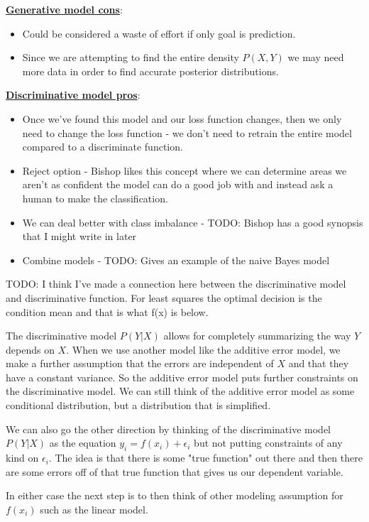 \noindent \underline{\textbf{Generative model cons}}:
\begin{itemize}
\item Could be considered a waste of effort if only goal is prediction. 
\item Since we are attempting to find the entire density $P(X,Y)$ we may need more data in order to find accurate posterior distributions.
\end{itemize}

\noindent \underline{\textbf{Discriminative model pros}}:
\begin{itemize}
\item Once we've found this model and our loss function changes, then we only need to change the loss function - we don't need to retrain the entire model compared to a discriminate function.
\item Reject option - Bishop likes this concept where we can determine areas we aren't as confident the model can do a good job with and instead ask a human to make the classification.
\item We can deal better with class imbalance - TODO: Bishop has a good synopsis that I might write in later
\item Combine models - TODO: Gives an example of the naive Bayes model
\end{itemize}

TODO: I think I've made a connection here between the discriminative model and discriminative function. For least squares the optimal decision is the condition mean and that is what f(x) is below.

The discriminative model $P(Y|X)$ allows for completely summarizing the way $Y$ depends on $X$. When we use another model like the additive error model, we make a further assumption that the errors are independent of $X$ and that they have a constant variance. So the additive error model puts further constraints on the discriminative model. We can still think of the additive error model as some conditional distribution, but a distribution that is simplified.

We can also go the other direction by thinking of the discriminative model $P(Y|X)$ as the equation $y_i = f(x_i) + \epsilon_i$ but not putting constraints of any kind on $\epsilon_i$. The idea is that there is some "true function" out there and then there are some errors off of that true function that gives us our dependent variable.

In either case the next step is to then think of other modeling assumption for $f(x_i)$ such as the linear model.


